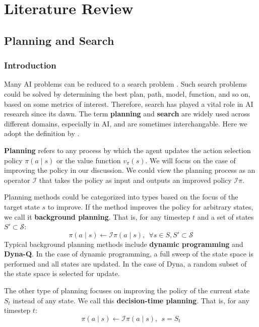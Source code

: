\section{Literature Review}

\subsection{Planning and Search}
\subsubsection{Introduction}
Many AI problems can be reduced to a search problem \cite[p.39]{ArtificialIntelligenceGames_Yannakakis.Togelius_2018}.
Such search problems could be solved by determining the best plan, path, model, function, and so on, based on some metrics of interest.
Therefore, search has played a vital role in AI research since its dawn. The term  \textbf{planning} and \textbf{search} are widely used across different domains, especially in AI,
and are sometimes interchangable.
Here we adopt the definition by \citeauthor{ReinforcementLearningIntroduction_Sutton.Barto_2018} \cite{ReinforcementLearningIntroduction_Sutton.Barto_2018}.

\textbf{Planning} refers to any process by which the agent updates the action selection policy $\pi(a \mid s)$ or the value function $v_\pi(s)$.
We will focus on the case of improving the policy in our discussion.
We could view the planning process as an operator $\mathcal{I}$ that takes the policy as input and outputs an improved policy $\mathcal{I}\pi$.

Planning methods could be categorized into types based on the focus of the target state $s$ to improve.
If the method improves the policy for arbitrary states, we call it \textbf{background planning}.
That is, for any timestep $t$ and a set of states $S' \subset \mathcal{S}$:
$$\pi(a \mid s) \leftarrow \mathcal{I}\pi(a \mid s), ~~ \forall s \in S,  S' \subset \mathcal{S}$$
Typical background planning methods include \textbf{dynamic programming} and \textbf{Dyna-Q}.
In the case of dynamic programming, a full sweep of the state space is performed and all states are updated.
In the case of Dyna, a random subset of the state space is selected for update.

The other type of planning focuses on improving the policy of the current state $S_t$ instead of any state.
We call this \textbf{decision-time planning}.
That is, for any timestep $t$:
$$\pi(a \mid s) \leftarrow \mathcal{I}\pi(a \mid s), ~~ s = S_t$$


